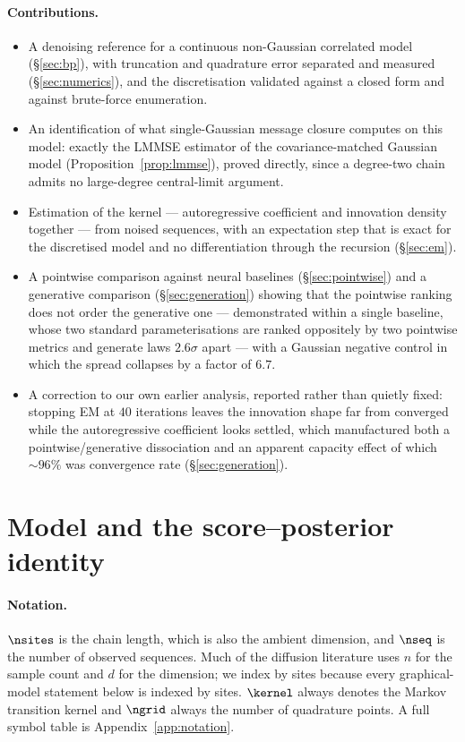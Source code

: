 \documentclass{article}
\begin{document}
\paragraph{Contributions.}
\begin{itemize}\itemsep2pt
\item A denoising reference for a continuous non-Gaussian correlated model
      (\S\ref{sec:bp}), with truncation and quadrature error separated and measured
      (\S\ref{sec:numerics}), and the discretisation validated against a closed form and against
      brute-force enumeration.
\item An identification of what single-Gaussian message closure computes on this model: exactly
      the LMMSE estimator of the covariance-matched Gaussian model
      (Proposition~\ref{prop:lmmse}), proved directly, since a degree-two chain admits no
      large-degree central-limit argument.
\item Estimation of the kernel --- autoregressive coefficient and innovation density together
      --- from noised sequences, with an expectation step that is exact for the discretised
      model and no differentiation through the recursion (\S\ref{sec:em}).
\item A pointwise comparison against neural baselines (\S\ref{sec:pointwise}) and a generative
      comparison (\S\ref{sec:generation}) showing that the pointwise ranking does not order the
      generative one --- demonstrated within a single baseline, whose two standard
      parameterisations are ranked oppositely by two pointwise metrics and generate laws
      $2.6\sigma$ apart --- with a Gaussian negative control in which the spread collapses by a
      factor of $6.7$.
\item A correction to our own earlier analysis, reported rather than quietly fixed: stopping EM
      at $40$ iterations leaves the innovation shape far from converged while the autoregressive
      coefficient looks settled, which manufactured both a pointwise/generative dissociation and
      an apparent capacity effect of which ${\sim}96\%$ was convergence rate
      (\S\ref{sec:generation}).
\end{itemize}

\section{Model and the score--posterior identity}
\label{sec:setting}

\paragraph{Notation.} $\nsites$ is the chain length, which is also the ambient dimension, and
$\nseq$ is the number of observed sequences. Much of the diffusion literature uses $n$ for the
sample count and $d$ for the dimension; we index by sites because every graphical-model
statement below is indexed by sites. $\kernel$ always denotes the Markov transition kernel and
$\ngrid$ always the number of quadrature points. A full symbol table is
Appendix~\ref{app:notation}.
\end{document}
